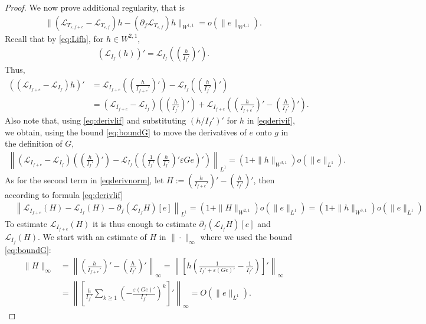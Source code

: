 \documentclass[12pt]{article}
\def\L{\mathcal{L}}
\newcommand{\eps}{\varepsilon}
\theoremstyle{plain}
\begin{document}
{\begin{proof}
We now prove additional regularity, that is
\begin{align*}
    \|(\L_{T_{\eps, f+e}}-\L_{T_{\eps, f}})h-(\partial_f\L_{T_{\eps, f}})h\|_{W^{1,1}}=o(\|e\|_{W^{1,1}}).
\end{align*}
Recall that by \eqref{eq:Lifh}, for $h\in W^{2,1}$,
\begin{align*}
    \left(\L_{I_f}(h)\right)'=\L_{I_f}(\left(\frac{h}{I_f'}\right)').
\end{align*}
Thus,
\begin{align}
    \left(\left(\L_{I_{f+e}}-\L_{I_f}\right)h\right)'&=
\L_{I_{f+e}}\left(\left(\frac{h}{I_{f+e}'}\right)'\right)-\L_{I_f}\left(\left(\frac{h}{I_f'}\right)'\right)\nonumber\\
    &=(\L_{I_{f+e}}-\L_{I_f})\left(\left(\frac{h}{I_f'}\right)'\right)+\L_{I_{f+e}}\left(\left(\frac{h}{I_{f+e}'}\right)'-\left(\frac{h}{I_f'}\right)'\right).\label{eqderivnorm}
\end{align}
Also note that, using \eqref{eq:derivlif} and substituting $(h/I_f')'$ for $h$ in \eqref{eqderivif}, we obtain, using the bound \eqref{eq:boundG} to move the derivatives of $e$ onto $g$ in the definition of $G$,
\begin{align}\label{eqtermunderiv}
    \left\|(\L_{I_{f+e}}-\L_{I_f})\left(\left(\frac{h}{I_f'}\right)'\right)-\L_{I_f}\left(\left(\frac{1}{I_f'}\left(\frac{h}{I_f'}\right)'\eps Ge\right)'\right)\right\|_{L^1}=(1+\|h\|_{W^{3,1}})o(\|e\|_{L^1}).
\end{align}
As for the second term in \eqref{eqderivnorm}, let $H:=\left(\frac{h}{I_{f+e}'}\right)'-\left(\frac{h}{I_f'}\right)'$, then according to formula \eqref{eq:derivlif}
\begin{align}\label{eq:Hderiv}
&\left\|\L_{I_{f+e}}\left(H\right)-\L_{I_f}\left(H\right)-\partial_f(\L_{I_f}H)[e]\right\|_{L^1}=(1+\|H\|_{W^{2,1}})o(\|e\|_{L^1})=(1+\|h\|_{W^{3,1}})o(\|e\|_{L^1})
\end{align}
To estimate $\L_{I_{f+e}}\left(H\right)$ it is thus enough to estimate $\partial_f(\L_{I_f}H)[e]$ and $\L_{I_f}\left(H\right)$.
We start with an estimate of $H$ in $\|\cdot\|_\infty$ where we used the bound \eqref{eq:boundG}: 
\begin{align}
  \|H\|_\infty&=\left\| \left(\frac{h}{I_{f+e}'}\right)'-\left(\frac{h}{I_f'}\right)' \right\|_\infty=\left\|\left[h\left(\frac{1}{I_{f}'+\eps (Ge)'}-\frac{1}{I_{f}'}\right)\right]'\right\|_\infty\nonumber\\
  &=\left\|\left[\frac{h}{I_{f}'}\sum_{k\geq 1}\left(-\frac{\eps (Ge)'}{I_{f}'}\right)^k\right]'\right\|_\infty=O(\|e\|_{L^1}).\label{Hinfbound}
\end{align}


\end{proof}}
\end{document}
